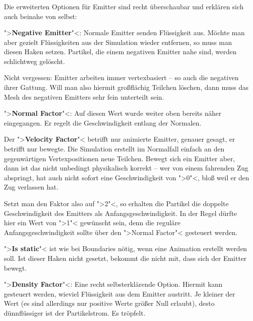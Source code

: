 \documentclass[10pt,DIV=14,a4paper]{scrartcl}
\begin{document}
\subsubsection{}
Die erweiterten Optionen für Emitter sind recht überschaubar und
erklären sich auch beinahe von selbst:

\itA
	\item ">\textbf{Negative Emitter}"<: Normale Emitter senden
	Flüssigkeit aus. Möchte man aber gezielt Flüssigkeiten aus der
	Simulation wieder entfernen, so muss man diesen Haken setzen.
	Partikel, die einem negativen Emitter nahe sind, werden schlichtweg
	gelöscht.

	Nicht vergessen: Emitter arbeiten immer vertexbasiert -- so auch
	die negativen ihrer Gattung. Will man also hiermit großflächig
	Teilchen löschen, dann muss das Mesh des negativen Emitters sehr
	fein unterteilt sein.

	\item ">\textbf{Normal Factor}"<: Auf diesen Wert wurde weiter oben
	bereits näher eingegangen. Er regelt die Geschwindigkeit entlang der
	Normalen.

	\item Der ">\textbf{Velocity Factor}"< betrifft nur animierte
	Emitter, genauer gesagt, er betrifft nur bewegte. Die Simulation
	erstellt im Normalfall einfach an den gegenwärtigen Vertexpositionen
	neue Teilchen. Bewegt sich ein Emitter aber, dann ist das nicht
	unbedingt physikalisch korrekt -- wer von einem fahrenden Zug
	abspringt, hat auch nicht sofort eine Geschwindigkeit von ">0"<,
	bloß weil er den Zug verlassen hat.

	Setzt man den Faktor also auf ">2"<, so erhalten die Partikel die
	doppelte Geschwindigkeit des Emitters als Anfangsgeschwindigkeit. In
	der Regel dürfte hier ein Wert von ">1"< gewünscht sein, denn die
	reguläre Anfangsgeschwindigkeit sollte über den ">Normal Factor"<
	gesteuert werden.

	\item ">\textbf{Is static}"< ist wie bei Boundaries nötig, wenn eine
	Animation erstellt werden soll. Ist dieser Haken nicht gesetzt,
	bekommt die \fluidsim nicht mit, dass sich der Emitter bewegt.

	\item ">\textbf{Density Factor}"<: Eine recht selbsterklärende
	Option. Hiermit kann gesteuert werden, wieviel Flüssigkeit aus dem
	Emitter austritt. Je kleiner der Wert (es sind allerdings nur
	positive Werte größer Null erlaubt), desto dünnflüssiger ist der
	Partikelstrom. Es tröpfelt.
\end{document}
